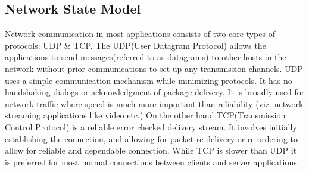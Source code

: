 








\iffalse
\subsection{Network State Model}
\label{sec:networkStateModel}

Network communication in most applications consists of two core types of protocols: UDP \& TCP.
The UDP(User Datagram Protocol) allows the applications to send messages(referred to as datagrams) to other hosts in the network without prior communications to set up any transmission channels.
UDP uses a simple communication mechanism while minimizing protocols. 
It has no handshaking dialogs or acknowledgment of package delivery. It is broadly used for network traffic where speed is much more important than reliability (viz. network streaming applications like video etc.)
On the other hand TCP(Transmission Control Protocol) is a reliable error checked delivery stream.
It involves initially establishing the connection, and allowing for packet re-delivery or re-ordering to allow for reliable and dependable connection. 
While TCP is slower than UDP it is preferred for most normal connections between clients and server applications.

